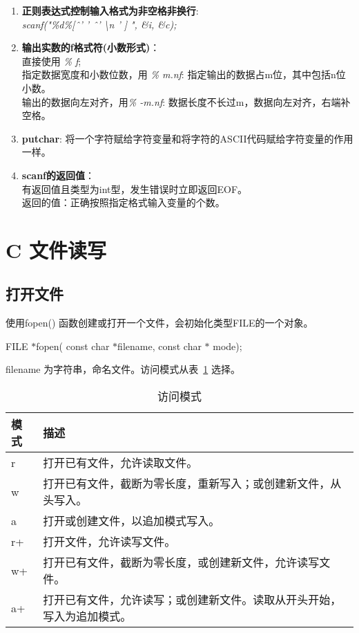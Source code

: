 \documentclass[UTF8]{ctexart}
\begin{document}
\begin{framed}
\begin{enumerate}
					\item \textbf{正则表达式控制输入格式为非空格非换行}: \\\emph{scanf("\%d\%[\^ \ ' ' \^ \ ' \textbackslash n ' ] ", \&i, \&c);}
					\item \textbf{输出实数的f格式符(小数形式)}：\\直接使用 \emph{\% f}; \\ 指定数据宽度和小数位数，用 \emph{\% m.nf}: 指定输出的数据占m位，其中包括n位小数。\\ 输出的数据向左对齐，用\emph{\% -m.nf}: 数据长度不长过m，数据向左对齐，右端补空格。
					\item \textbf{putchar}: 将一个字符赋给字符变量和将字符的ASCII代码赋给字符变量的作用一样。
					\item \textbf{scanf的返回值}：\\有返回值且类型为int型，发生错误时立即返回EOF。\\返回的值：正确按照指定格式输入变量的个数。
				\end{enumerate}
			\end{framed}

			\clearpage
			\section{C 文件读写}
			\subsection{打开文件}
			使用fopen() 函数创建或打开一个文件，会初始化类型FILE的一个对象。
			\begin{framed}
				FILE $*$fopen( const char $*$filename, const char $*$ mode);
			\end{framed}
			filename 为字符串，命名文件。访问模式从表~\ref{fopen访问模式} 选择。
			\begin{table}
				\caption{访问模式}\label{fopen访问模式}
				\begin{tabular}[]{l|p{28em}}
					\toprule
					模式&描述\\
					\midrule
					r&打开已有文件，允许读取文件。\\
					w&打开已有文件，截断为零长度，重新写入；或创建新文件，从头写入。\\
					a&打开或创建文件，以追加模式写入。\\
					r+&打开文件，允许读写文件。\\
					w+&打开已有文件，截断为零长度，或创建新文件，允许读写文件。\\
					a+&打开已有文件，允许读写；或创建新文件。读取从开头开始，写入为追加模式。\\
					\bottomrule
				\end{tabular}
			\end{table}
\end{document}
